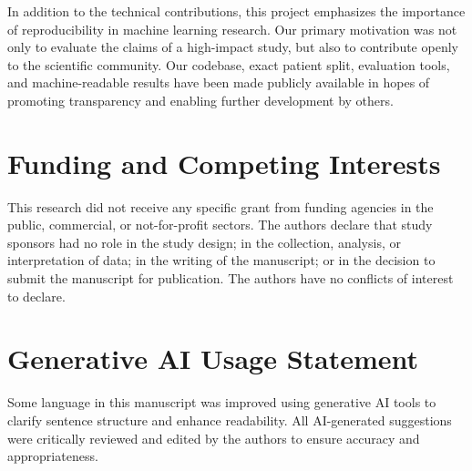 In addition to the technical contributions, this project emphasizes the importance
of reproducibility in machine learning research. Our primary motivation was not only to
evaluate the claims of a high-impact study, but also to contribute openly to
the scientific community. Our codebase, exact patient split, evaluation tools,
and machine-readable results have been made publicly available in hopes of
promoting transparency and enabling further development by others.

\section{Funding and Competing Interests}

This research did not receive any specific grant from funding agencies in the
public, commercial, or not-for-profit sectors. The authors declare that study
sponsors had no role in the study design; in the collection, analysis, or
interpretation of data; in the writing of the manuscript; or in the decision
to submit the manuscript for publication. The authors have no conflicts of
interest to declare.

\section{Generative AI Usage Statement}

Some language in this manuscript was improved using generative AI tools to
clarify sentence structure and enhance readability. All AI-generated
suggestions were critically reviewed and edited by the authors to ensure
accuracy and appropriateness.
